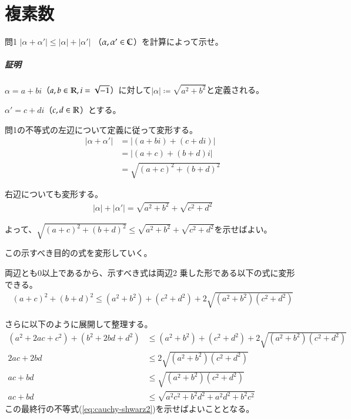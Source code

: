 \chapter{複素数}%

\begin{mysimplebox}{問1}
$|\alpha+\alpha'|\le|\alpha|+|\alpha'|$
（$\alpha,\alpha'\in\mathbb{C}$）を計算によって示せ。
\end{mysimplebox}
\paragraph{証明}
$\alpha=a+bi$（$a, b\in\mathbb{R}, i=\sqrt{-1}$）に対して$|\alpha|\coloneqq\sqrt{a^2+b^2}$と定義される。

$\alpha'=c+di$（$c,d\in\mathbb{R}$）とする。

問1の不等式の左辺について定義に従って変形する。
\begin{align*}
    |\alpha+\alpha'|&=|(a+bi)+(c+di)|\\
    &=|(a+c)+(b+d)i|\\
    &=\sqrt{(a+c)^2+(b+d)^2}
\end{align*}

右辺についても変形する。
\begin{align*}
    |\alpha|+|\alpha'|=\sqrt{a^2+b^2}+\sqrt{c^2+d^2}
\end{align*}

よって、$\sqrt{(a+c)^2+(b+d)^2}\le\sqrt{a^2+b^2}+\sqrt{c^2+d^2}$を示せばよい。

この示すべき目的の式を変形していく。

両辺とも0以上であるから、示すべき式は両辺2
乗した形である以下の式に変形できる。
\begin{align*}
    (a+c)^2+(b+d)^2\le(a^2+b^2)+(c^2+d^2)+2\sqrt{(a^2+b^2)(c^2+d^2)}
\end{align*}

さらに以下のように展開して整理する。
\begin{align}
    (a^2+2ac+c^2)+(b^2+2bd+d^2)&\le (a^2+b^2)+(c^2+d^2)+2\sqrt{(a^2+b^2)(c^2+d^2)}\nonumber\\
    2ac+2bd&\le 2\sqrt{(a^2+b^2)(c^2+d^2)}\nonumber\\
    ac+bd&\le \sqrt{(a^2+b^2)(c^2+d^2)}\label{eq:cauchy-shwarz}\\
    ac+bd&\le \sqrt{a^2c^2+b^2d^2+a^2d^2+b^2c^2}\label{eq:cauchy-shwarz2}
\end{align}
この最終行の不等式(\ref{eq:cauchy-shwarz2})を示せばよいこととなる。

